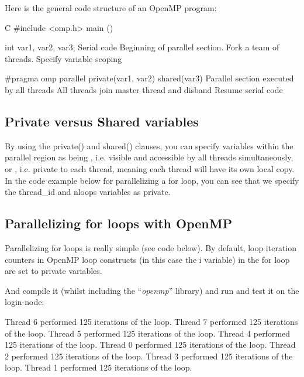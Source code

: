 Here is the general code structure of an OpenMP program:

\begin{code}{C}
#include <omp.h>
main ()  {
int var1, var2, var3;
Serial code
Beginning of parallel section. Fork a team of threads.
Specify variable scoping

#pragma omp parallel private(var1, var2) shared(var3)
  {
  Parallel section executed by all threads
  All threads join master thread and disband
  }
Resume serial code
}
\end{code}

\subsection{Private versus Shared variables}

By using the private() and shared() clauses, you can specify variables within
the parallel region as being , i.e. visible and accessible by
all threads simultaneously, or , i.e. private to each thread,
meaning each thread will have its own local copy. In the code example below for
parallelizing a for loop, you can see that we specify the thread\_id and nloops
variables as private.

\subsection{Parallelizing for loops with OpenMP}

Parallelizing for loops is really simple (see code below). By default, loop
iteration counters in OpenMP loop constructs (in this case the i variable) in
the for loop are set to private variables.


And compile it (whilst including the ``\emph{openmp}'' library) and run and test it on the login-node:

\begin{prompt}
Thread 6 performed 125 iterations of the loop.
Thread 7 performed 125 iterations of the loop.
Thread 5 performed 125 iterations of the loop.
Thread 4 performed 125 iterations of the loop.
Thread 0 performed 125 iterations of the loop.
Thread 2 performed 125 iterations of the loop.
Thread 3 performed 125 iterations of the loop.
Thread 1 performed 125 iterations of the loop.
\end{prompt}

